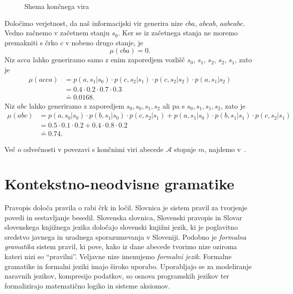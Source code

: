 \documentclass[fin1, tisk]{fmfdelo}
\newcommand{\A}{\mathcal{A}}
\theoremstyle{definition}
\begin{document}
\begin{primer}
\begin{figure}[H]
        \caption{Shema končnega vira}
        \label{fig:FSM}
    \end{figure}
    Določimo verjetnost, da naš informacijski vir generira nize $\mathit{cba}$, $\mathit{abcab}$, 
    $\mathit{aabcabc}$. Vedno začnemo v začetnem stanju $s_0$. Ker se iz začetnega stanja 
    ne moremo premakniti s črko $c$ v nobeno drugo stanje, je
    \[
        \mu(\mathit{cba}) = 0.
    \]
    Niz $\mathit{acca}$ lahko generiramo samo z enim zaporedjem vozlišč 
    $s_0$, $s_1$, $s_2$, $s_2$, $s_1$, zato je
    \begin{align*}
        \mu(\mathit{acca}) &= p(a, s_1|s_0) \cdot p(c, s_2|s_1) \cdot p(c, s_2|s_2) \cdot p(a, s_1|s_2) \\
        &= 0.4 \cdot 0.2 \cdot 0.7 \cdot 0.3 \\
        &\doteq 0.0168.
    \end{align*}
    Niz $\mathit{abc}$ lahko generiramo z zaporedjem $s_0, s_0, s_1, s_2$ ali pa s
    $s_0, s_1, s_1, s_2$, zato je
    \begin{align*}
        \mu(\mathit{abc}) &= p(a, s_0|s_0) \cdot p(b, s_1|s_0) \cdot p(c, s_2|s_1) 
        + p(a, s_1|s_0) \cdot p(b, s_1|s_1) \cdot p(c, s_2|s_1) \\
        &= 0.5 \cdot 0.1 \cdot 0.2 + 0.4 \cdot 0.8 \cdot 0.2 \\
        &\doteq 0.74.
    \end{align*}
\end{primer}

Več o odvečnosti v povezavi s končnimi viri abecede $\A$ stopnje $m$,
najdemo v~\cite{Plotkin1992}.

\section{Kontekstno-neodvisne gramatike}

Pravopis določa pravila o rabi črk in ločil. Slovnica je sistem pravil 
za tvorjenje povedi in sestavljanje besedil. Slovenska slovnica, Slovenski pravopis in Slovar 
slovenskega knjižnega jezika določajo slovenski knjižni jezik, ki je poglavitno sredstvo javnega 
in uradnega sporazumevanja v Sloveniji. Podobno je \emph{formalna gramatika} sistem pravil, ki pove,
kako iz dane abecede tvorimo nize oziroma kateri nizi so ``pravilni''. Veljavne nize imenujemo 
\emph{formalni jezik}. Formalne gramatike in formalni jeziki imajo široko uporabo. Uporabljajo se
za modeliranje naravnih jezikov, kompresijo podatkov, so osnova programskih jezikov ter 
formalizirajo matematično logiko in sisteme aksiomov.
\end{document}
